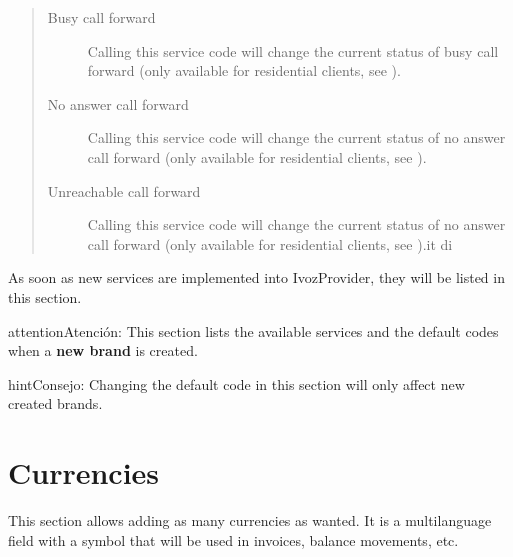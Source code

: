 \documentclass[letterpaper,10pt,spanish]{sphinxmanual}
\begin{document}
\begin{quote}
\begin{description}
\item[{Busy call forward}] \leavevmode
Calling this service code will change the current status of busy call forward (only available for
residential clients, see {\hyperref[administration_portal/client/residential/residential_devices:residential\string-devices\string-cfw]{}}).

\item[{No answer call forward}] \leavevmode
Calling this service code will change the current status of no answer call forward (only available for
residential clients, see {\hyperref[administration_portal/client/residential/residential_devices:residential\string-devices\string-cfw]{}}).

\item[{Unreachable call forward}] \leavevmode
Calling this service code will change the current status of no answer call forward (only available for
residential clients, see {\hyperref[administration_portal/client/residential/residential_devices:residential\string-devices\string-cfw]{}}).it di

\end{description}
\end{quote}

As soon as new services are implemented into IvozProvider, they will be listed
in this section.

\begin{notice}{attention}{Atención:}
This section lists the available services and the default codes
when a \textbf{new brand} is created.
\end{notice}

\begin{notice}{hint}{Consejo:}
Changing the default code in this section will only affect new
created brands.
\end{notice}


\section{Currencies}
\label{administration_portal/platform/currencies:currencies}\label{administration_portal/platform/currencies::doc}
This section allows adding as many currencies as wanted. It is a multilanguage field with a symbol that will be used
in invoices, balance movements, etc.
\end{document}
